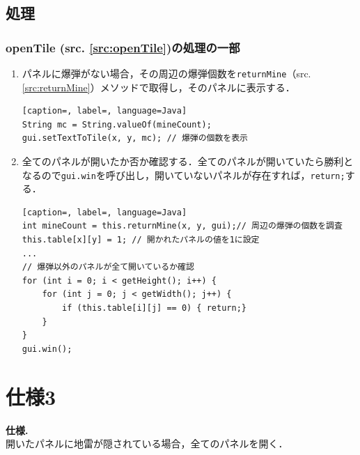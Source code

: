 \documentclass[a4j,11pt]{jsarticle}
\newcommand{\srcref}[1]{src. \ref{#1}}
\newcommand{\met}[1]{\ttfamily #1 \normalfont (\srcref{src:#1})の処理}
\begin{document}
\subsection{処理}\label{sec:openTile}
\subsubsection*{\met{openTile}の一部}
\begin{enumerate}
    \item パネルに爆弾がない場合，その周辺の爆弾個数を{\verb|returnMine|}（\srcref{src:returnMine}）メソッドで取得し，そのパネルに表示する．
          \begin{lstlisting}[caption=, label=, language=Java]
String mc = String.valueOf(mineCount);
gui.setTextToTile(x, y, mc); // 爆弾の個数を表示
    \end{lstlisting}
    \item 全てのパネルが開いたか否か確認する．全てのパネルが開いていたら勝利となるので{\verb|gui.win|}を呼び出し，開いていないパネルが存在すれば，{\verb|return;|}する．
          \begin{lstlisting}[caption=, label=, language=Java]
int mineCount = this.returnMine(x, y, gui);// 周辺の爆弾の個数を調査
this.table[x][y] = 1; // 開かれたパネルの値を1に設定
...
// 爆弾以外のパネルが全て開いているか確認
for (int i = 0; i < getHeight(); i++) {
    for (int j = 0; j < getWidth(); j++) {
        if (this.table[i][j] == 0) { return;}
    }
}
gui.win();
\end{lstlisting}
\end{enumerate}
\newpage

\section*{仕様3}
\setcounter{section}{3}
\setcounter{subsection}{0}
\begin{screen}
    \textbf{仕様\thesection.}\\
    開いたパネルに地雷が隠されている場合，全てのパネルを開く．
\end{screen}
\end{document}
